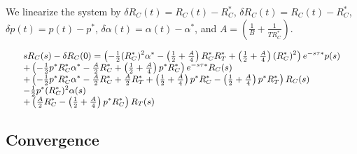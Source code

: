 We linearize the system by $\delta {R_C}(t) = {R_C}(t) - R_C^*$, $\delta {R_C}(t) = {R_C}(t) - R_C^*$,
$\delta p(t) = p(t) - p^*$, $\delta \alpha (t) = \alpha (t) - \alpha^*$, and $A = \left( {\frac{1}{B} + \frac{1}{{TR_C^*}}} \right)$.

\begin{equation}
\small
\begin{array}{l}
s{R_C}(s) - \delta {R_C}(0) = \left( { - \frac{1}{2}{{(R_C^*)}^2}{\alpha ^*} - \left( {\frac{1}{2} + \frac{A}{4}} \right)R_C^*R_T^* + \left( {\frac{1}{2} + \frac{A}{4}} \right){{(R_C^*)}^2}} \right){e^{ - s\tau *}}p(s)\\
 + \left( { - \frac{1}{2}{p^*}R_C^*{\alpha ^*} - \frac{A}{2}R_C^* + \left( {\frac{1}{2} + \frac{A}{4}} \right){p^*}R_C^*} \right){e^{ - s\tau *}}{R_C}(s)\\
 + \left( { - \frac{1}{2}{p^*}R_C^*{\alpha ^*} - \frac{A}{2}R_C^* + \frac{A}{2}R_T^* + \left( {\frac{1}{2} + \frac{A}{4}} \right){p^*}R_C^* - \left( {\frac{1}{2} + \frac{A}{4}} \right){p^*}R_T^*} \right){R_C}(s)\\
 - \frac{1}{2}{p^*}{(R_C^*)^2}\alpha (s)\\
 + \left( {\frac{A}{2}R_C^* - \left( {\frac{1}{2} + \frac{A}{4}} \right){p^*}R_C^*} \right){R_T}(s)
\end{array}
\end{equation}

\subsection{Convergence}
